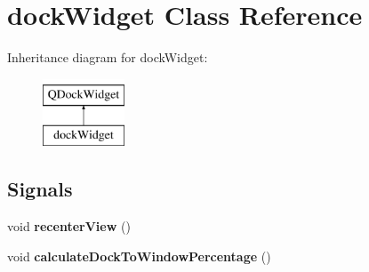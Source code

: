 \hypertarget{classdock_widget}{}\section{dock\+Widget Class Reference}
\label{classdock_widget}
Inheritance diagram for dock\+Widget\+:\begin{figure}[H]
\begin{center}
\leavevmode
\includegraphics[height=2.000000cm]{classdock_widget}
\end{center}
\end{figure}
\subsection*{Signals}
\begin{DoxyCompactItemize}
\item 
\mbox{\label{classdock_widget_acc2d0ff853683454fab7e90e1c772540}} 
void {\bfseries recenter\+View} ()
\item 
\mbox{\label{classdock_widget_a9204c64451a6cf19229c1d93b289f24e}} 
void {\bfseries calculate\+Dock\+To\+Window\+Percentage} ()
\end{DoxyCompactItemize}
